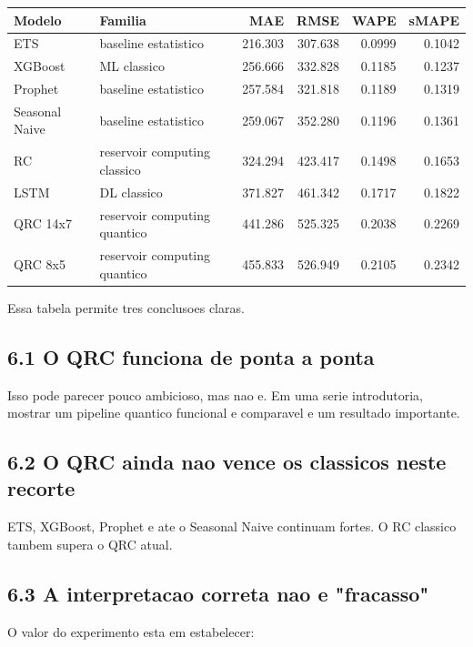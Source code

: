 \documentclass[12pt]{article}
\begin{document}
\begin{longtable}[]{@{}llrrrr@{}}
\toprule\noalign{}
Modelo & Familia & MAE & RMSE & WAPE & sMAPE \\
\midrule\noalign{}
\endhead
\bottomrule\noalign{}
\endlastfoot
ETS & baseline estatistico & 216.303 & 307.638 & 0.0999 & 0.1042 \\
XGBoost & ML classico & 256.666 & 332.828 & 0.1185 & 0.1237 \\
Prophet & baseline estatistico & 257.584 & 321.818 & 0.1189 & 0.1319 \\
Seasonal Naive & baseline estatistico & 259.067 & 352.280 & 0.1196 & 0.1361 \\
RC & reservoir computing classico & 324.294 & 423.417 & 0.1498 & 0.1653 \\
LSTM & DL classico & 371.827 & 461.342 & 0.1717 & 0.1822 \\
QRC 14x7 & reservoir computing quantico & 441.286 & 525.325 & 0.2038 & 0.2269 \\
QRC 8x5 & reservoir computing quantico & 455.833 & 526.949 & 0.2105 & 0.2342 \\
\end{longtable}

Essa tabela permite tres conclusoes claras.

\subsection{6.1 O QRC funciona de ponta a ponta}\label{61-o-qrc-funciona-de-ponta-a-ponta}

Isso pode parecer pouco ambicioso, mas nao e. Em uma serie introdutoria, mostrar um pipeline quantico funcional e comparavel e um resultado importante.

\subsection{6.2 O QRC ainda nao vence os classicos neste recorte}\label{62-o-qrc-ainda-nao-vence-os-classicos-neste-recorte}

ETS, XGBoost, Prophet e ate o Seasonal Naive continuam fortes. O RC classico tambem supera o QRC atual.

\subsection{6.3 A interpretacao correta nao e "fracasso"}\label{63-a-interpretacao-correta-nao-e-fracasso}

O valor do experimento esta em estabelecer:
\end{document}
